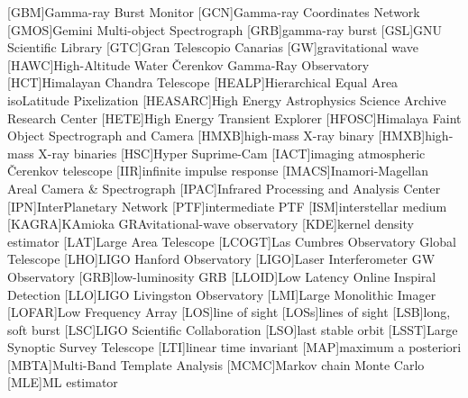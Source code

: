 \begin{acronym}
[GBM]{Gamma-ray Burst Monitor}
[GCN]{Gamma-ray Coordinates Network}
[GMOS]{Gemini Multi-object Spectrograph}
[GRB]{gamma-ray burst}
[GSL]{GNU Scientific Library}
[GTC]{Gran Telescopio Canarias}
[GW]{gravitational wave}
[HAWC]{High\nobreakdashes-Altitude Water \v{C}erenkov Gamma\nobreakdashes-Ray Observatory}
[HCT]{Himalayan Chandra Telescope}
[HEALP]{Hierarchical Equal Area isoLatitude Pixelization}
[HEASARC]{High Energy Astrophysics Science Archive Research Center}
[HETE]{High Energy Transient Explorer}
[HFOSC]{Himalaya Faint Object Spectrograph and Camera}
[HMXB]{high\nobreakdashes-mass X\nobreakdashes-ray binary}
[HMXB]{high\nobreakdashes-mass X\nobreakdashes-ray binaries}
[HSC]{Hyper Suprime\nobreakdashes-Cam}
[IACT]{imaging atmospheric \v{C}erenkov telescope}
[IIR]{infinite impulse response}
[IMACS]{Inamori-Magellan Areal Camera \& Spectrograph}
[IPAC]{Infrared Processing and Analysis Center}
[IPN]{InterPlanetary Network}
[PTF]{intermediate \acl{PTF}}
[ISM]{interstellar medium}
[KAGRA]{KAmioka GRAvitational\nobreakdashes-wave observatory}
[KDE]{kernel density estimator}
[LAT]{Large Area Telescope}
[LCOGT]{Las Cumbres Observatory Global Telescope}
[LHO]{\ac{LIGO} Hanford Observatory}
[LIGO]{Laser Interferometer \acs{GW} Observatory}
[GRB]{low\nobreakdashes-luminosity \ac{GRB}}
[LLOID]{Low Latency Online Inspiral Detection}
[LLO]{\ac{LIGO} Livingston Observatory}
[LMI]{Large Monolithic Imager}
[LOFAR]{Low Frequency Array}
[LOS]{line of sight}
[LOSs]{lines of sight}
[LSB]{long, soft burst}
[LSC]{\acs{LIGO} Scientific Collaboration}
[LSO]{last stable orbit}
[LSST]{Large Synoptic Survey Telescope}
[LTI]{linear time invariant}
[MAP]{maximum a posteriori}
[MBTA]{Multi-Band Template Analysis}
[MCMC]{Markov chain Monte Carlo}
[MLE]{\ac{ML} estimator}

\end{acronym}
